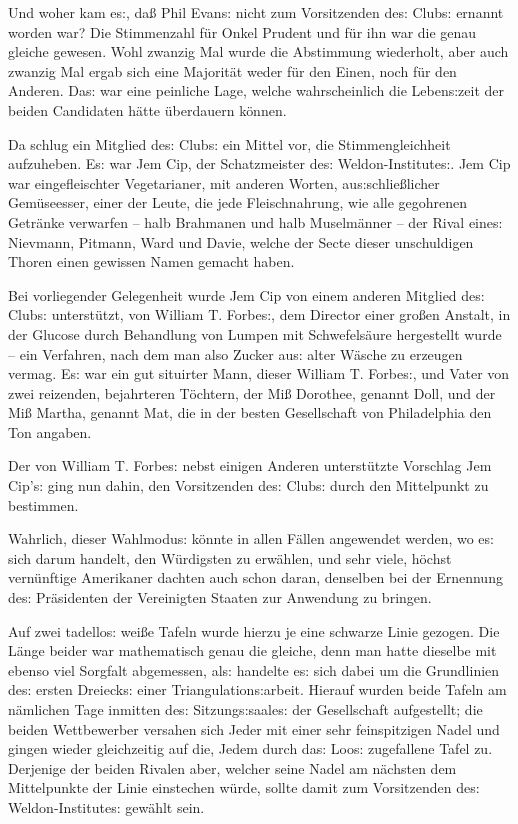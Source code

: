 \documentclass[oneside,12pt]{book}
\newcommand{\s}{s:}
\begin{document}
Und woher kam e{\s}, da{\ss} Phil Evan{\s} nicht zum Vorsitzenden
de{\s} Club{\s} ernannt worden war? Die Stimmenzahl f\"ur Onkel
Prudent und f\"ur ihn war die genau gleiche gewesen. Wohl zwanzig Mal
wurde die Abstimmung wiederholt, aber auch zwanzig Mal ergab sich
eine Majorit\"at weder f\"ur den Einen, noch f\"ur den Anderen.
Da{\s} war eine peinliche Lage, welche wahrscheinlich die
Leben{\s}zeit der beiden Candidaten h\"atte \"uberdauern k\"onnen.

Da schlug ein Mitglied de{\s} Club{\s} ein Mittel vor, die
Stimmengleichheit aufzuheben. E{\s} war Jem Cip, der Schatzmeister
de{\s} Weldon-Institute{\s}. Jem Cip war eingefleischter
Vegetarianer, mit anderen Worten, au{\s}schlie{\ss}licher
Gem\"useesser, einer der Leute, die jede Fleischnahrung, wie alle
gegohrenen Getr\"anke verwarfen -- halb Brahmanen und halb
Muselm\"anner -- der Rival eine{\s} Nievmann, Pitmann, Ward und
Davie, welche der Secte dieser unschuldigen Thoren einen gewissen
Namen gemacht haben.

Bei vorliegender Gelegenheit wurde Jem Cip von einem anderen Mitglied
de{\s} Club{\s} unterst\"utzt, von William T. Forbe{\s}, dem Director
einer gro{\ss}en Anstalt, in der Glucose durch Behandlung von Lumpen
mit Schwefels\"aure hergestellt wurde -- ein Verfahren, nach dem man
also Zucker au{\s} alter W\"asche zu erzeugen vermag. E{\s} war ein
gut situirter Mann, dieser William T. Forbe{\s}, und Vater von zwei
reizenden, bejahrteren T\"ochtern, der Mi{\ss} Dorothee, genannt
Doll, und der Mi{\ss} Martha, genannt Mat, die in der besten
Gesellschaft von Philadelphia den Ton angaben.

Der von William T. Forbe{\s} nebst einigen Anderen unterst\"utzte
Vorschlag Jem Cip'{\s} ging nun dahin, den Vorsitzenden de{\s}
Club{\s} durch den Mittelpunkt zu bestimmen.

Wahrlich, dieser Wahlmodu{\s} k\"onnte in allen F\"allen angewendet
werden, wo e{\s} sich darum handelt, den W\"urdigsten zu erw\"ahlen,
und sehr viele, h\"ochst vern\"unftige Amerikaner dachten auch schon
daran, denselben bei der Ernennung de{\s} Pr\"asidenten der
Vereinigten Staaten zur Anwendung zu bringen.

Auf zwei tadello{\s} wei{\ss}e Tafeln wurde hierzu je eine schwarze
Linie gezogen. Die L\"ange beider war mathematisch genau die gleiche,
denn man hatte dieselbe mit ebenso viel Sorgfalt abgemessen, al{\s}
handelte e{\s} sich dabei um die Grundlinien de{\s} ersten
Dreieck{\s} einer Triangulation{\s}arbeit. Hierauf wurden beide
Tafeln am n\"amlichen Tage inmitten de{\s} Sitzung{\s}saale{\s} der
Gesellschaft aufgestellt; die beiden Wettbewerber versahen sich Jeder
mit einer sehr feinspitzigen Nadel und gingen wieder gleichzeitig auf
die, Jedem durch da{\s} Loo{\s} zugefallene Tafel zu. Derjenige der
beiden Rivalen aber, welcher seine Nadel am n\"achsten dem
Mittelpunkte der Linie einstechen w\"urde, sollte damit zum
Vorsitzenden de{\s} Weldon-Institute{\s} gew\"ahlt sein.
\end{document}
